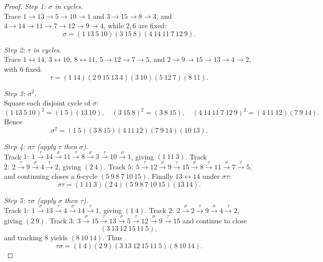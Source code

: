 \documentclass[12pt]{article}
\theoremstyle{definition}
\begin{document}
\begin{proof}
\noindent\emph{Step 1: $\sigma$ in cycles.}\\
Trace $1\to13\to5\to10\to1$ and $3\to15\to8\to3$, and $4\to14\to11\to7\to12\to9\to4$, while $2,6$ are fixed:
\[
\sigma=(1\ 13\ 5\ 10)(3\ 15\ 8)(4\ 14\ 11\ 7\ 12\ 9).
\]

\dotfill

\noindent\emph{Step 2: $\tau$ in cycles.}\\
Trace $1\leftrightarrow14$, $3\leftrightarrow10$, $8\leftrightarrow11$, $5\to12\to7\to5$, and $2\to9\to15\to13\to4\to2$, with $6$ fixed:
\[
\tau=(1\ 14)(2\ 9\ 15\ 13\ 4)(3\ 10)(5\ 12\ 7)(8\ 11).
\]

\dotfill

\noindent\emph{Step 3: $\sigma^{2}$.}\\
Square each disjoint cycle of $\sigma$:
\[
(1\ 13\ 5\ 10)^2=(1\ 5)(13\ 10),\quad (3\ 15\ 8)^2=(3\ 8\ 15),\quad (4\ 14\ 11\ 7\ 12\ 9)^2=(4\ 11\ 12)(7\ 9\ 14).
\]
Hence
\[
\sigma^{2}=(1\ 5)(3\ 8\ 15)(4\ 11\ 12)(7\ 9\ 14)(10\ 13).
\]

\dotfill

\noindent\emph{Step 4: $\sigma\tau$ (apply $\tau$ then $\sigma$).}\\
Track $1:\ 1\xrightarrow{\tau}14\xrightarrow{\sigma}11\xrightarrow{\tau}8\xrightarrow{\sigma}3\xrightarrow{\tau}10\xrightarrow{\sigma}1$,
giving $(1\ 11\ 3)$.
Track $2:\ 2\xrightarrow{\tau}9\xrightarrow{\sigma}4\xrightarrow{\tau}2$, giving $(2\ 4)$.
Track $5:\ 5\xrightarrow{\tau}12\xrightarrow{\sigma}9\xrightarrow{\tau}15\xrightarrow{\sigma}8\xrightarrow{\tau}11\xrightarrow{\sigma}7\xrightarrow{\tau}5$,
and continuing closes a $6$-cycle $(5\ 9\ 8\ 7\ 10\ 15)$.
Finally $13\leftrightarrow14$ under $\sigma\tau$:
\[
\sigma\tau=(1\ 11\ 3)(2\ 4)(5\ 9\ 8\ 7\ 10\ 15)(13\ 14).
\]

\dotfill

\noindent\emph{Step 5: $\tau\sigma$ (apply $\sigma$ then $\tau$).}\\
Track $1:\ 1\xrightarrow{\sigma}13\xrightarrow{\tau}4\xrightarrow{\sigma}14\xrightarrow{\tau}1$, giving $(1\ 4)$.
Track $2:\ 2\xrightarrow{\sigma}2\xrightarrow{\tau}9\xrightarrow{\sigma}4\xrightarrow{\tau}2$, giving $(2\ 9)$.
Track $3:\ 3\xrightarrow{\sigma}15\xrightarrow{\tau}13\xrightarrow{\sigma}5\xrightarrow{\tau}12\xrightarrow{\sigma}9\xrightarrow{\tau}15$ and continue to close
\[
(3\ 13\ 12\ 15\ 11\ 5),
\]
and tracking $8$ yields $(8\ 10\ 14)$. Thus
\[
\tau\sigma=(1\ 4)(2\ 9)(3\ 13\ 12\ 15\ 11\ 5)(8\ 10\ 14).
\]


\end{proof}
\end{document}
